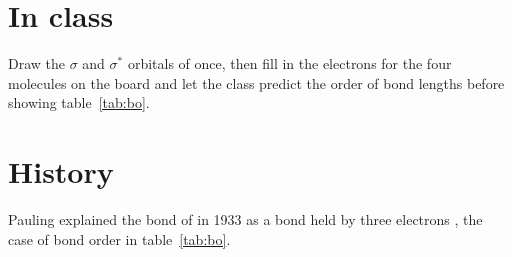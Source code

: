 \section{In class}
Draw the $\sigma$ and $\sigma^*$ orbitals of  once, then fill in the electrons for the four molecules on the board and let the class predict the order of bond lengths before showing table~\ref{tab:bo}.

\section{History}
Pauling explained the bond of  in 1933 as a bond held by three electrons \cite{pauling1933}, the case of bond order \textonehalf{} in table~\ref{tab:bo}.
